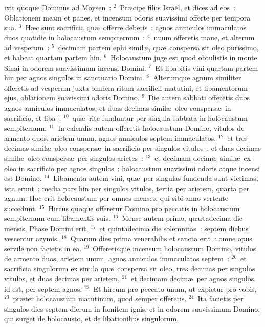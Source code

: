 \bchapter
{}ixit quoque Dominus ad Moysen~:
${}^{2}$~Pr\ae cipe filiis Isra\"el, et dices ad eos~: Oblationem meam et panes, et incensum odoris suavissimi offerte per tempora sua.
${}^{3}$~H\ae c sunt sacrificia qu\ae\ offerre debetis~: agnos anniculos immaculatos duos quotidie in holocaustum sempiternum~:
${}^{4}$~unum offeretis mane, et alterum ad vesperum~:
${}^{5}$~decimam partem ephi simil\ae , qu\ae\ conspersa sit oleo purissimo, et habeat quartam partem hin.
${}^{6}$~Holocaustum juge est quod obtulistis in monte Sinai in odorem suavissimum incensi Domini.
${}^{7}$~Et libabitis vini quartam partem hin per agnos singulos in sanctuario Domini.
${}^{8}$~Alterumque agnum similiter offeretis ad vesperam juxta omnem ritum sacrificii matutini, et libamentorum ejus, oblationem suavissimi odoris Domino.
${}^{9}$~Die autem sabbati offeretis duos agnos anniculos immaculatos, et duas decimas simil\ae\ oleo conspers\ae\ in sacrificio, et liba~:
${}^{10}$~qu\ae\ rite funduntur per singula sabbata in holocaustum sempiternum.
${}^{11}$~In calendis autem offeretis holocaustum Domino, vitulos de armento duos, arietem unum, agnos anniculos septem immaculatos,
${}^{12}$~et tres decimas simil\ae\ oleo conspers\ae\ in sacrificio per singulos vitulos~: et duas decimas simil\ae\ oleo conspers\ae\ per singulos arietes~:
${}^{13}$~et decimam decim\ae\ simil\ae\ ex oleo in sacrificio per agnos singulos~: holocaustum suavissimi odoris atque incensi est Domino.
${}^{14}$~Libamenta autem vini, qu\ae\ per singulas fundenda sunt victimas, ista erunt~: media pars hin per singulos vitulos, tertia per arietem, quarta per agnum. Hoc erit holocaustum per omnes menses, qui sibi anno vertente succedunt.
${}^{15}$~Hircus quoque offeretur Domino pro peccatis in holocaustum sempiternum cum libamentis suis.
${}^{16}$~Mense autem primo, quartadecima die mensis, Phase Domini erit,
${}^{17}$~et quintadecima die solemnitas~: septem diebus vescentur azymis.
${}^{18}$~Quarum dies prima venerabilis et sancta erit~: omne opus servile non facietis in ea.
${}^{19}$~Offeretisque incensum holocaustum Domino, vitulos de armento duos, arietem unum, agnos anniculos immaculatos septem~:
${}^{20}$~et sacrificia singulorum ex simila qu\ae\ conspersa sit oleo, tres decimas per singulos vitulos, et duas decimas per arietem,
${}^{21}$~et decimam decim\ae\ per agnos singulos, id est, per septem agnos.
${}^{22}$~Et hircum pro peccato unum, ut expietur pro vobis,
${}^{23}$~pr\ae ter holocaustum matutinum, quod semper offeretis.
${}^{24}$~Ita facietis per singulos dies septem dierum in fomitem ignis, et in odorem suavissimum Domino, qui surget de holocausto, et de libationibus singulorum.
